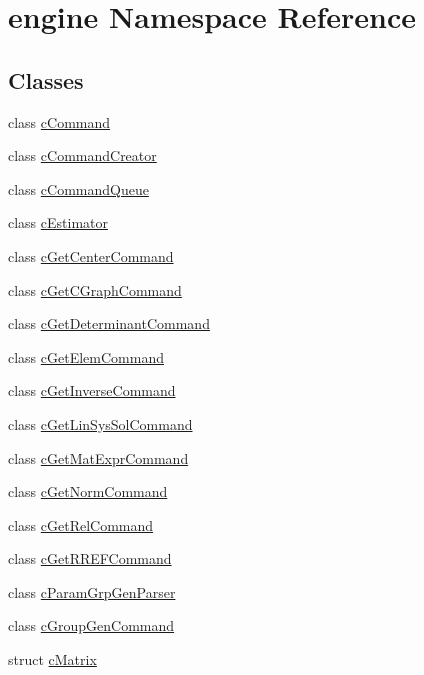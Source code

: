 \hypertarget{namespaceengine}{\section{engine Namespace Reference}
\label{namespaceengine}
}
\subsection*{Classes}
\begin{DoxyCompactItemize}
\item 
class \hyperlink{classengine_1_1cCommand}{c\-Command}
\item 
class \hyperlink{classengine_1_1cCommandCreator}{c\-Command\-Creator}
\item 
class \hyperlink{classengine_1_1cCommandQueue}{c\-Command\-Queue}
\item 
class \hyperlink{classengine_1_1cEstimator}{c\-Estimator}
\item 
class \hyperlink{classengine_1_1cGetCenterCommand}{c\-Get\-Center\-Command}
\item 
class \hyperlink{classengine_1_1cGetCGraphCommand}{c\-Get\-C\-Graph\-Command}
\item 
class \hyperlink{classengine_1_1cGetDeterminantCommand}{c\-Get\-Determinant\-Command}
\item 
class \hyperlink{classengine_1_1cGetElemCommand}{c\-Get\-Elem\-Command}
\item 
class \hyperlink{classengine_1_1cGetInverseCommand}{c\-Get\-Inverse\-Command}
\item 
class \hyperlink{classengine_1_1cGetLinSysSolCommand}{c\-Get\-Lin\-Sys\-Sol\-Command}
\item 
class \hyperlink{classengine_1_1cGetMatExprCommand}{c\-Get\-Mat\-Expr\-Command}
\item 
class \hyperlink{classengine_1_1cGetNormCommand}{c\-Get\-Norm\-Command}
\item 
class \hyperlink{classengine_1_1cGetRelCommand}{c\-Get\-Rel\-Command}
\item 
class \hyperlink{classengine_1_1cGetRREFCommand}{c\-Get\-R\-R\-E\-F\-Command}
\item 
class \hyperlink{classengine_1_1cParamGrpGenParser}{c\-Param\-Grp\-Gen\-Parser}
\item 
class \hyperlink{classengine_1_1cGroupGenCommand}{c\-Group\-Gen\-Command}
\item 
struct \hyperlink{structengine_1_1cMatrix}{c\-Matrix}
\item 

\end{DoxyCompactItemize}
